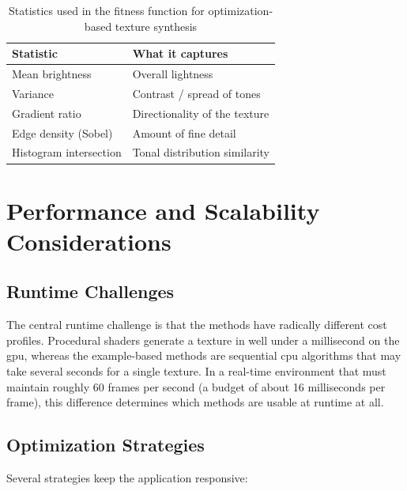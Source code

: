 \begin{table}[H]
    \centering
    \caption{Statistics used in the fitness function for optimization-based texture synthesis}
    \label{tab:fintess-function-statistics}
    \begin{tabularx}{\textwidth}{|l|X|}
    \hline
    \textbf{Statistic} & \textbf{What it captures} \\
    \hline
    \hline
    
    Mean brightness & Overall lightness \\
    \hline

    Variance & Contrast / spread of tones \\
    \hline

    Gradient ratio & Directionality of the texture \\
    \hline

    Edge density (Sobel) & Amount of fine detail \\
    \hline

    Histogram intersection & Tonal distribution similarity \\
    \hline
    
    \end{tabularx}
\end{table}

\section{Performance and Scalability Considerations}

\subsection{Runtime Challenges}

The central runtime challenge is that the methods have radically different cost profiles. Procedural shaders generate a texture in well under a millisecond on the \gls{gpu}, whereas the example-based methods are sequential \gls{cpu} algorithms that may take several seconds for a single texture. In a real-time environment that must maintain roughly 60 frames per second (a budget of about 16 milliseconds per frame), this difference determines which methods are usable at runtime at all.

\subsection{Optimization Strategies}

Several strategies keep the application responsive:


